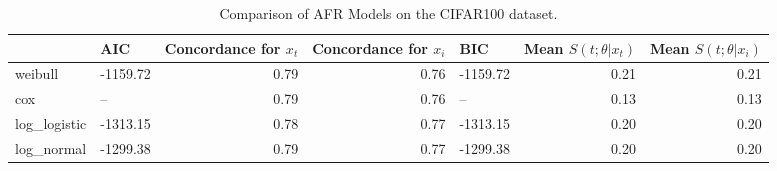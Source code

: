 \begin{table}
\caption{Comparison of AFR Models on the CIFAR100 dataset.}
\label{tab:cifar100}
\begin{tabular}{llrrlrr}
\toprule
 & AIC & Concordance for $x_t$ & Concordance for $x_i$ & BIC & Mean $S(t;\theta|x_{t})$ & Mean $S(t;\theta|x_{i})$ \\
\midrule
weibull & -1159.72 & 0.79 & 0.76 & -1159.72 & 0.21 & 0.21 \\
cox & -- & 0.79 & 0.76 & -- & 0.13 & 0.13 \\
log_logistic & -1313.15 & 0.78 & 0.77 & -1313.15 & 0.20 & 0.20 \\
log_normal & -1299.38 & 0.79 & 0.77 & -1299.38 & 0.20 & 0.20 \\
\bottomrule
\end{tabular}
\end{table}
